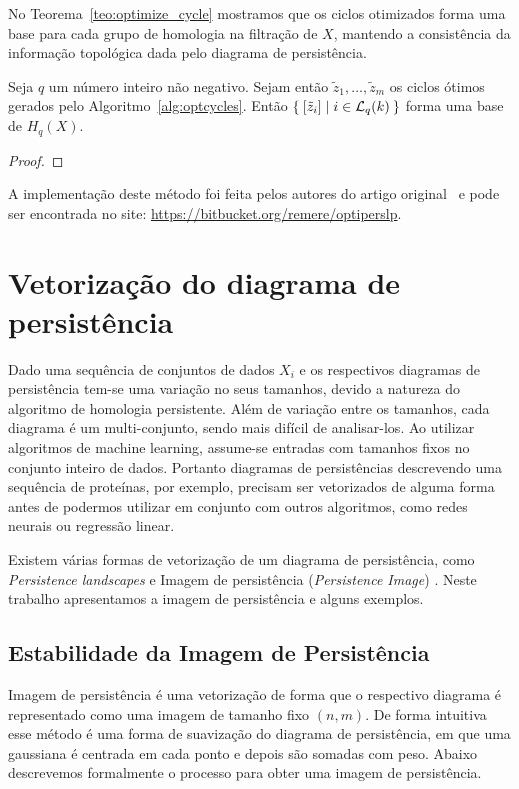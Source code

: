 No Teorema~\ref{teo:optimize_cycle} mostramos que os ciclos otimizados forma uma base para cada 
grupo de homologia na filtração de $X$, mantendo a consistência da informação topológica dada
pelo diagrama de persistência. 
\begin{teo}\label{teo:optimize_cycle}
    Seja $q$ um número inteiro não negativo. Sejam então $\tilde{z}_1, \dots, \tilde{z}_m$ os 
    ciclos ótimos gerados pelo Algoritmo~\ref{alg:optcycles}. Então 
    $\Set{[\tilde{z}_i] | i \in \mathcal{L}_q(k)}$ forma uma base de $H_q(X)$.
\end{teo}
\begin{proof}

\end{proof} 

A implementação deste método foi feita pelos autores do artigo original~\cite{Escolar2015} e
pode ser encontrada no site: \url{https://bitbucket.org/remere/optiperslp}.
\section{Vetorização do diagrama de persistência}
Dado uma sequência de conjuntos de dados $X_i$ e os respectivos diagramas de persistência tem-se uma variação no
seus tamanhos, devido a natureza do algoritmo de homologia persistente. Além de variação entre os tamanhos, cada 
diagrama é um multi-conjunto, sendo mais difícil de analisar-los. Ao utilizar algoritmos de machine learning, 
assume-se entradas com tamanhos fixos no conjunto inteiro de dados. Portanto diagramas de persistências descrevendo
uma sequência de proteínas, por exemplo, precisam ser vetorizados de alguma forma antes de podermos utilizar em
conjunto com outros algoritmos, como redes neurais ou regressão linear. 

Existem várias formas de vetorização de um diagrama de persistência, como \textit{Persistence landscapes}
\cite{bubenik15a} e Imagem de persistência (\textit{Persistence Image}) \cite{Adams2017}. Neste trabalho apresentamos
a imagem de persistência e alguns exemplos.

\subsection{Estabilidade da Imagem de Persistência}
Imagem de persistência é uma vetorização de forma que o respectivo diagrama é representado como 
uma imagem de tamanho fixo $(n,m)$. De forma intuitiva esse método é uma forma de suavização do diagrama 
de persistência, em que uma gaussiana é centrada em cada ponto e depois são somadas com peso. Abaixo descrevemos
formalmente o processo para obter uma imagem de persistência.


